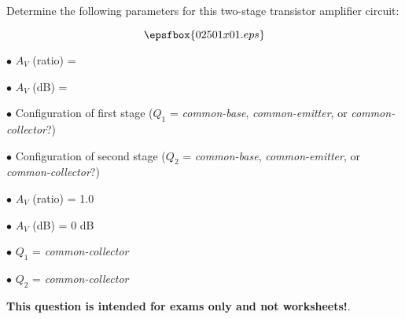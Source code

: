 

Determine the following parameters for this two-stage transistor amplifier circuit:

$$\epsfbox{02501x01.eps}$$

\medskip
\item{$\bullet$} $A_V$ (ratio) = 
\item{$\bullet$} $A_V$ (dB) = 
\item{$\bullet$} Configuration of first stage ($Q_1$ = {\it common-base}, {\it common-emitter}, or {\it common-collector}?)
\item{$\bullet$} Configuration of second stage ($Q_2$ = {\it common-base}, {\it common-emitter}, or {\it common-collector}?)
\medskip







\medskip
\item{$\bullet$} $A_V$ (ratio) = 1.0
\item{$\bullet$} $A_V$ (dB) = 0 dB
\item{$\bullet$} $Q_1$ = {\it common-collector}
\item{$\bullet$} $Q_2$ = {\it common-collector}
\medskip







{\bf This question is intended for exams only and not worksheets!}.





